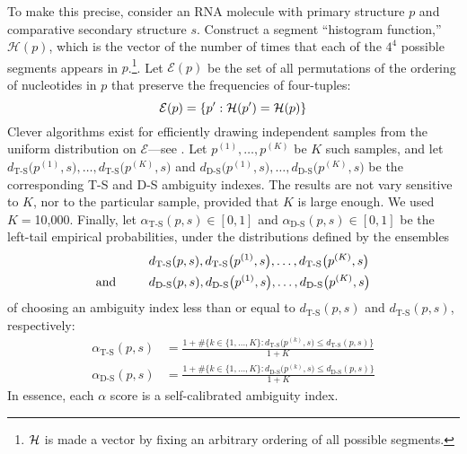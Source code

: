 \documentclass[10pt,letterpaper]{article}
\begin{document}
To make this precise, consider an RNA molecule with primary structure $p$ and comparative secondary structure $s$. Construct a segment ``histogram function,'' $\mathcal{H}(p)$, which is the 
vector of the number of times that each of the $4^4$ possible segments appears in $p$.\footnote{${\cal H}$ is made a vector by fixing an arbitrary ordering of all possible segments.}.
Let $\mathcal E(p)$ be the set of all permutations of the ordering of nucleotides in $p$ that preserve the frequencies of four-tuples:
\[
{\cal E}(p) = \{p': {\cal H}(p')={\cal H}(p)\}
\]
Clever algorithms exist for efficiently drawing independent samples from the uniform distribution on $\mathcal{E}$---see \cite{Kandel1996-kz, Fitch1983-ec, Altschul1985-nq}. Let $p^{(1)},
\ldots,p^{(K)}$ be $K$ such samples, and let $\displaystyle
d_\text{T-S}\big(p^{(1)},s\big),\ldots,d_\text{T-S}\big(p^{(K)},s\big)$ and
$\displaystyle
d_\text{D-S}\big(p^{(1)},s\big),\ldots,d_\text{D-S}\big(p^{(K)},s\big)$ 
be the corresponding T-S and D-S ambiguity indexes. The results are not vary sensitive to $K$, nor to the particular sample, provided that $K$ is large enough. We used $K=$10,000. Finally, let 
$\alpha_\text{T-S}(p,s) \in [0,1]$ and
$\alpha_\text{D-S}(p,s) \in [0,1]$
be the left-tail empirical probabilities, under the distributions defined by the ensembles
\begin{align}
&  d_\text{T-S}(p,s),d_\text{T-S}\big(p^{(1)},s\big),\ldots,d_\text{T-S}\big(p^{(K)},s\big) 
\label{eqn:T-Sensemble}\\
\text{and \hglue .8cm} 
& d_\text{D-S}(p,s),d_\text{D-S}\big(p^{(1)},s\big),\ldots,d_\text{D-S}\big(p^{(K)},s\big) 
\label{eqn:D-Sensemble}
\end{align}
of choosing an ambiguity index less than or equal to $d_\text{T-S}(p,s)$ and 
$d_\text{T-S}(p,s)$, respectively:
\begin{align}
\alpha_\text{T-S}(p,s)  & = \frac
{1 + \#\{k\in\{1,\ldots,K\}: d_\text{T-S}\big(p^{(k)},s\big) \leq d_\text{T-S}(p,s)\}}{1+K} \label{eqn:alpha_T-S} \\
\alpha_\text{D-S}(p,s)  & = \frac
{1 + \#\{k\in\{1,\ldots,K\}: d_\text{D-S}\big(p^{(k)},s\big)\leq d_\text{D-S}(p,s)\}}{1+K} \label{eqn:alpha_D-S}
\end{align}
In essence, each $\alpha$ score is a self-calibrated ambiguity index.
\end{document}
